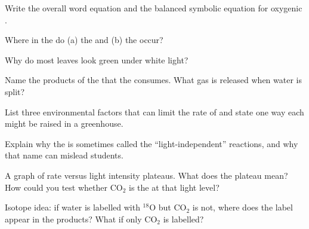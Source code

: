 \begin{exercise}[$\star$]\label{exo:g10:photosynthesis:1}
Write the overall word equation and the balanced symbolic equation for
oxygenic .
\end{exercise}

\begin{exercise}[$\star$]\label{exo:g10:photosynthesis:2}
Where in the  do (a) the  and
(b) the  occur?
\end{exercise}

\begin{exercise}[$\star$]\label{exo:g10:photosynthesis:3}
Why do most leaves look green under white light?
\end{exercise}

\begin{exercise}[$\star$]\label{exo:g10:photosynthesis:4}
Name the products of the  that the 
consumes. What gas is released when water is split?
\end{exercise}

\begin{exercise}[$\star$]\label{exo:g10:photosynthesis:5}
List three environmental factors that can limit the rate of
 and state one way each might be raised in a greenhouse.
\end{exercise}

\begin{exercise}[$\star\star$]\label{exo:g10:photosynthesis:6}
Explain why the  is sometimes called the ``light-independent''
reactions, and why that name can mislead students.
\end{exercise}

\begin{exercise}[$\star\star$]\label{exo:g10:photosynthesis:7}
A graph of  rate versus light intensity plateaus. What does
the plateau mean? How could you test whether $\mathrm{CO_2}$ is the
 at that light level?
\end{exercise}

\begin{exercise}[$\star\star$]\label{exo:g10:photosynthesis:8}
Isotope  idea: if water is labelled with $^{18}\mathrm{O}$ but
$\mathrm{CO_2}$ is not, where does the label appear in the products?
What if only $\mathrm{CO_2}$ is labelled?
\end{exercise}

